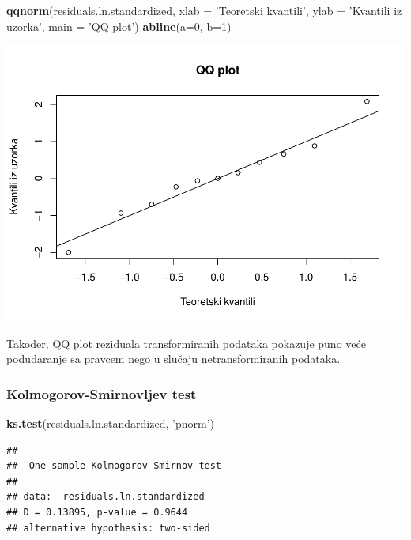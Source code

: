 \documentclass[]{article}
\newenvironment{Shaded}{\begin{snugshade}}{\end{snugshade}}
\newcommand{\KeywordTok}[1]{\textcolor[rgb]{0.13,0.29,0.53}{\textbf{{#1}}}}
\newcommand{\DataTypeTok}[1]{\textcolor[rgb]{0.13,0.29,0.53}{{#1}}}
\newcommand{\DecValTok}[1]{\textcolor[rgb]{0.00,0.00,0.81}{{#1}}}
\newcommand{\StringTok}[1]{\textcolor[rgb]{0.31,0.60,0.02}{{#1}}}
\newcommand{\NormalTok}[1]{{#1}}
\begin{document}
\begin{Shaded}
\begin{Highlighting}[]
\KeywordTok{qqnorm}\NormalTok{(residuals.ln.standardized, }\DataTypeTok{xlab =} \StringTok{'Teoretski kvantili'}\NormalTok{, }\DataTypeTok{ylab =} \StringTok{'Kvantili iz uzorka'}\NormalTok{,}
       \DataTypeTok{main =} \StringTok{'QQ plot'}\NormalTok{)}
\KeywordTok{abline}\NormalTok{(}\DataTypeTok{a=}\DecValTok{0}\NormalTok{, }\DataTypeTok{b=}\DecValTok{1}\NormalTok{)}
\end{Highlighting}
\end{Shaded}

\includegraphics{Izvjestaj_files/figure-latex/unnamed-chunk-12-1.pdf}

Također, QQ plot reziduala transformiranih podataka pokazuje puno veće
podudaranje sa pravcem nego u slučaju netransformiranih podataka.

\subsubsection{Kolmogorov-Smirnovljev
test}\label{kolmogorov-smirnovljev-test-1}

\begin{Shaded}
\begin{Highlighting}[]
\KeywordTok{ks.test}\NormalTok{(residuals.ln.standardized, }\StringTok{'pnorm'}\NormalTok{)}
\end{Highlighting}
\end{Shaded}

\begin{verbatim}
## 
##  One-sample Kolmogorov-Smirnov test
## 
## data:  residuals.ln.standardized
## D = 0.13895, p-value = 0.9644
## alternative hypothesis: two-sided
\end{verbatim}
\end{document}
